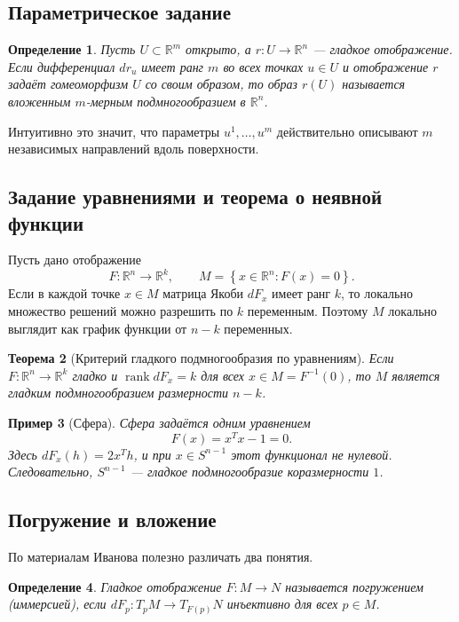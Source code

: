 \documentclass[12pt,a4paper]{article}
\theoremstyle{rudef}
\newtheorem{definition}{Определение}[section]
\newtheorem{example}[definition]{Пример}
\theoremstyle{ruplain}
\newtheorem{theorem}[definition]{Теорема}
\newcommand{\R}{\mathbb{R}}
\newcommand{\rank}{\operatorname{rank}}
\newcommand{\set}[1]{\left\{#1\right\}}
\begin{document}
\subsection{Параметрическое задание}

\begin{definition}
Пусть $U\subset \R^m$ открыто, а $r:U\to \R^n$ --- гладкое отображение. Если дифференциал $dr_u$ имеет ранг $m$ во всех точках $u\in U$ и отображение $r$ задаёт гомеоморфизм $U$ со своим образом, то образ $r(U)$ называется \emph{вложенным $m$-мерным подмногообразием} в $\R^n$.
\end{definition}

Интуитивно это значит, что параметры $u^1,\dots,u^m$ действительно описывают $m$ независимых направлений вдоль поверхности.

\subsection{Задание уравнениями и теорема о неявной функции}

Пусть дано отображение
\[
F:\R^n\to \R^k,
\qquad
M=\set{x\in \R^n:F(x)=0}.
\]
Если в каждой точке $x\in M$ матрица Якоби $dF_x$ имеет ранг $k$, то локально множество решений можно разрешить по $k$ переменным. Поэтому $M$ локально выглядит как график функции от $n-k$ переменных.

\begin{theorem}[Критерий гладкого подмногообразия по уравнениям]
Если $F:\R^n\to \R^k$ гладко и $\rank dF_x=k$ для всех $x\in M=F^{-1}(0)$, то $M$ является гладким подмногообразием размерности $n-k$.
\end{theorem}

\begin{example}[Сфера]
Сфера задаётся одним уравнением
\[
F(x)=x^Tx-1=0.
\]
Здесь $dF_x(h)=2x^Th$, и при $x\in S^{n-1}$ этот функционал не нулевой. Следовательно, $S^{n-1}$ --- гладкое подмногообразие коразмерности $1$.
\end{example}

\subsection{Погружение и вложение}

По материалам Иванова полезно различать два понятия.

\begin{definition}
Гладкое отображение $F:M\to N$ называется \emph{погружением} (иммерсией), если $dF_p:T_pM\to T_{F(p)}N$ инъективно для всех $p\in M$.
\end{definition}
\end{document}
